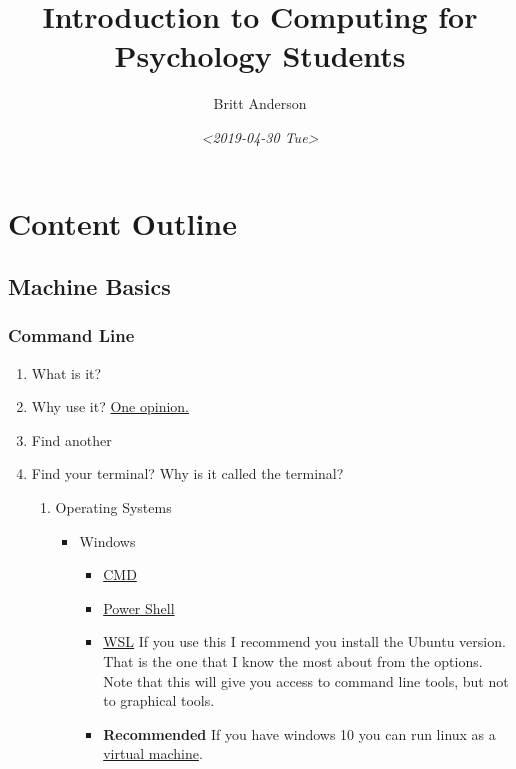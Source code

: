 \documentclass{article}
\author{Britt Anderson}
\date{\textit{<2019-04-30 Tue>}}
\title{Introduction to Computing for Psychology Students}
\begin{document}
\maketitle
\tableofcontents

\section{Content Outline}
\label{sec:orge1f8bc4}
\subsection{Machine Basics}
\label{sec:orgf199d5d}
\subsubsection{Command Line}
\label{sec:org6c542eb}
\begin{enumerate}
\item What is it?
\label{sec:orgd1759e7}
\item Why use it? \href{https://www.quora.com/How-important-is-it-to-learn-command-line-interfaces/answers/1620528}{One opinion.}
\label{sec:org84d063c}
\item Find another
\label{sec:org149e411}
\item Find your terminal?
\label{sec:org116214b}
Why is it called the terminal?
\begin{enumerate}
\item Operating Systems
\label{sec:org45b185a}
\begin{itemize}
\item Windows
\begin{itemize}
\item \href{https://www.howtogeek.com/235101/10-ways-to-open-the-command-prompt-in-windows-10/}{CMD}
\item \href{https://docs.microsoft.com/en-us/powershell/scripting/getting-started/getting-started-with-windows-powershell?view=powershell-6}{Power Shell}
\item \href{https://docs.microsoft.com/en-us/windows/wsl/install-win10}{WSL} 
If you use this I recommend you install the Ubuntu version. That is
the one that I know the most about from the options. Note that
this will give you access to command line tools, but not to
graphical tools.
\item \textbf{\textbf{Recommended}} If you have windows 10 you can run linux as a
\href{https://www.windowscentral.com/how-run-linux-distros-windows-10-using-hyper-v}{virtual machine}.
\end{itemize}

\end{itemize}
\end{enumerate}
\end{enumerate}
\end{document}
